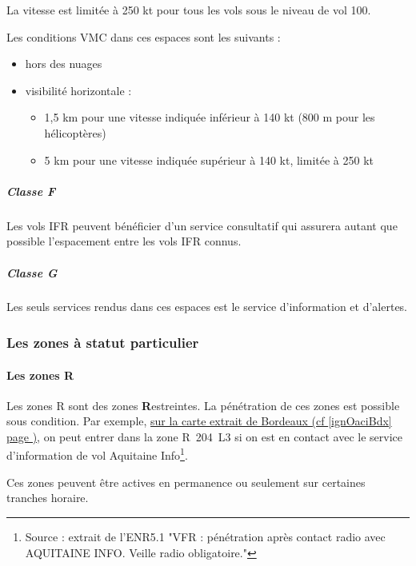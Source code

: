 				
		La vitesse est limitée à 250 kt pour tous les vols sous le niveau de vol 100.
		
		Les conditions VMC dans ces espaces sont les suivants :
		\begin{itemize}
			\item hors des nuages
			\item visibilité horizontale :
			\begin{itemize}
				\item 1,5 km pour une vitesse indiquée inférieur à 140 kt (800 m pour les hélicoptères)
				\item 5 km pour une vitesse indiquée supérieur à 140 kt, limitée à 250 kt
			\end{itemize}
		\end{itemize}
		
		\subparagraph{Classe F}
		Les vols IFR peuvent bénéficier d'un service consultatif qui assurera autant que possible l'espacement entre les vols IFR connus. 
		
		
		\subparagraph{Classe G}
		Les seuls services rendus dans ces espaces est le service d'information et d'alertes.
		
		
		\subsubsection{Les zones à statut particulier}
			\paragraph{Les zones R}
			Les zones R sont des zones \textbf{R}estreintes. La pénétration de ces zones est possible sous condition. Par exemple, \hyperlink{ignOaciBordeaux.1}{sur la carte extrait de Bordeaux (cf \ref{ignOaciBdx} page \pageref{ignOaciBdx})}, on peut entrer dans la zone R~204~L3 si on est en contact avec le service d'information de vol Aquitaine Info\footnote{Source : extrait de l'ENR5.1 "VFR : pénétration après contact radio avec AQUITAINE INFO. Veille radio obligatoire."}.
			
			Ces zones peuvent être actives en permanence ou seulement sur certaines tranches horaire.
			
